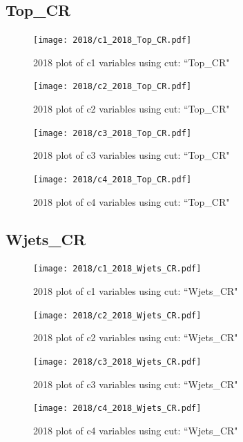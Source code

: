 \documentclass{article}
\begin{document}
      \subsection*{Top\_CR}
                        \begin{figure}[H]
                            \centering
                            \caption{2018 plot of c1 variables using cut: ``Top\_CR"}
                            \texttt{[image: 2018/c1\_2018\_Top\_CR.pdf]}
                        \end{figure}    
                        \begin{figure}[H]
                            \centering
                            \caption{2018 plot of c2 variables using cut: ``Top\_CR"}
                            \texttt{[image: 2018/c2\_2018\_Top\_CR.pdf]}
                        \end{figure}    
                        \begin{figure}[H]
                            \centering
                            \caption{2018 plot of c3 variables using cut: ``Top\_CR"}
                            \texttt{[image: 2018/c3\_2018\_Top\_CR.pdf]}
                        \end{figure}    
                        \begin{figure}[H]
                            \centering
                            \caption{2018 plot of c4 variables using cut: ``Top\_CR"}
                            \texttt{[image: 2018/c4\_2018\_Top\_CR.pdf]}
                        \end{figure}    
      \subsection*{Wjets\_CR}
                        \begin{figure}[H]
                            \centering
                            \caption{2018 plot of c1 variables using cut: ``Wjets\_CR"}
                            \texttt{[image: 2018/c1\_2018\_Wjets\_CR.pdf]}
                        \end{figure}    
                        \begin{figure}[H]
                            \centering
                            \caption{2018 plot of c2 variables using cut: ``Wjets\_CR"}
                            \texttt{[image: 2018/c2\_2018\_Wjets\_CR.pdf]}
                        \end{figure}    
                        \begin{figure}[H]
                            \centering
                            \caption{2018 plot of c3 variables using cut: ``Wjets\_CR"}
                            \texttt{[image: 2018/c3\_2018\_Wjets\_CR.pdf]}
                        \end{figure}    
                        \begin{figure}[H]
                            \centering
                            \caption{2018 plot of c4 variables using cut: ``Wjets\_CR"}
                            \texttt{[image: 2018/c4\_2018\_Wjets\_CR.pdf]}
                        \end{figure}    
\end{document}
